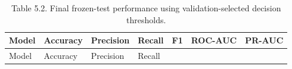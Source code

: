 \documentclass[
  canadian,
  12pt,
]{article}
\begin{document}
\begin{longtable}[]{@{}
  >{\raggedright\arraybackslash}p{}
  >{\raggedleft\arraybackslash}p{}
  >{\raggedleft\arraybackslash}p{}
  >{\raggedleft\arraybackslash}p{}
  >{\raggedleft\arraybackslash}p{}
  >{\raggedleft\arraybackslash}p{}
  >{\raggedleft\arraybackslash}p{}@{}}
\caption[Table 5.2. Final frozen-test performance using validation-selected decision\ldots]{Table 5.2. Final frozen-test performance using
validation-selected decision thresholds.}\tabularnewline
\toprule\noalign{}
\begin{minipage}[b]{\linewidth}\raggedright
Model
\end{minipage} & \begin{minipage}[b]{\linewidth}\raggedleft
Accuracy
\end{minipage} & \begin{minipage}[b]{\linewidth}\raggedleft
Precision
\end{minipage} & \begin{minipage}[b]{\linewidth}\raggedleft
Recall
\end{minipage} & \begin{minipage}[b]{\linewidth}\raggedleft
F1
\end{minipage} & \begin{minipage}[b]{\linewidth}\raggedleft
ROC-AUC
\end{minipage} & \begin{minipage}[b]{\linewidth}\raggedleft
PR-AUC
\end{minipage} \\
\midrule\noalign{}
\endfirsthead
\toprule\noalign{}
\begin{minipage}[b]{\linewidth}\raggedright
Model
\end{minipage} & \begin{minipage}[b]{\linewidth}\raggedleft
Accuracy
\end{minipage} & \begin{minipage}[b]{\linewidth}\raggedleft
Precision
\end{minipage} & \begin{minipage}[b]{\linewidth}\raggedleft
Recall
\end{minipage} & \begin{minipage}[b]{\linewidth}\raggedleft

\end{minipage}
\end{longtable}
\end{document}

